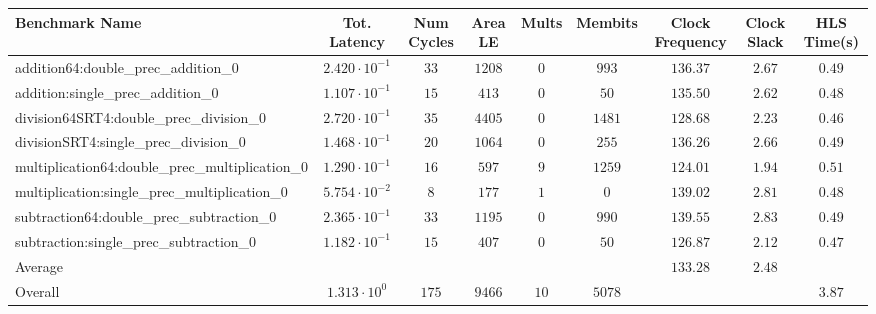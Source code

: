 \begin{tabular}{|l|c|c|c|c|c|c|c|c|}
\hline
Benchmark Name                                   & Tot. Latency            & Num Cycles & Area LE  & Mults  & Membits  & Clock Frequency & Clock Slack & HLS Time(s) \\
\hline
addition64:double\_prec\_addition\_0             & $ 2.420 \cdot 10^{-1} $ & $ 33     $ & $ 1208 $ & $ 0  $ & $ 993  $ & $ 136.37      $ & $ 2.67    $ & $ 0.49    $ \\
addition:single\_prec\_addition\_0               & $ 1.107 \cdot 10^{-1} $ & $ 15     $ & $ 413  $ & $ 0  $ & $ 50   $ & $ 135.50      $ & $ 2.62    $ & $ 0.48    $ \\
division64SRT4:double\_prec\_division\_0         & $ 2.720 \cdot 10^{-1} $ & $ 35     $ & $ 4405 $ & $ 0  $ & $ 1481 $ & $ 128.68      $ & $ 2.23    $ & $ 0.46    $ \\
divisionSRT4:single\_prec\_division\_0           & $ 1.468 \cdot 10^{-1} $ & $ 20     $ & $ 1064 $ & $ 0  $ & $ 255  $ & $ 136.26      $ & $ 2.66    $ & $ 0.49    $ \\
multiplication64:double\_prec\_multiplication\_0 & $ 1.290 \cdot 10^{-1} $ & $ 16     $ & $ 597  $ & $ 9  $ & $ 1259 $ & $ 124.01      $ & $ 1.94    $ & $ 0.51    $ \\
multiplication:single\_prec\_multiplication\_0   & $ 5.754 \cdot 10^{-2} $ & $ 8      $ & $ 177  $ & $ 1  $ & $ 0    $ & $ 139.02      $ & $ 2.81    $ & $ 0.48    $ \\
subtraction64:double\_prec\_subtraction\_0       & $ 2.365 \cdot 10^{-1} $ & $ 33     $ & $ 1195 $ & $ 0  $ & $ 990  $ & $ 139.55      $ & $ 2.83    $ & $ 0.49    $ \\
subtraction:single\_prec\_subtraction\_0         & $ 1.182 \cdot 10^{-1} $ & $ 15     $ & $ 407  $ & $ 0  $ & $ 50   $ & $ 126.87      $ & $ 2.12    $ & $ 0.47    $ \\
\hline
Average                                          & $                     $ & $        $ & $      $ & $    $ & $      $ & $ 133.28      $ & $ 2.48    $ & $         $ \\
\hline
Overall                                          & $ 1.313 \cdot 10^{0}  $ & $ 175    $ & $ 9466 $ & $ 10 $ & $ 5078 $ & $             $ & $         $ & $ 3.87    $ \\
\hline
\end{tabular}
